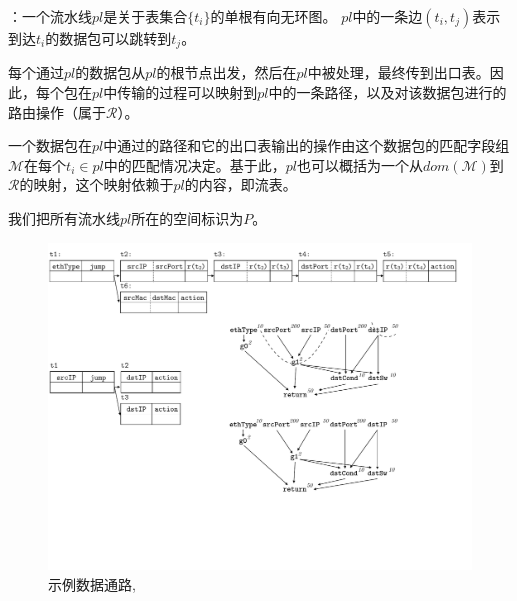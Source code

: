 ：一个流水线$pl$是关于表集合$\{t_i\}$的单根有向无环图。 $pl$中的一条边$(t_i, t_j)$表示到达$t_i$的数据包可以跳转到$t_j$。


每个通过$pl$的数据包从$pl$的根节点出发，然后在$pl$中被处理，最终传到出口表。因此，每个包在$pl$中传输的过程可以映射到$pl$中的一条路径，以及对该数据包进行的路由操作（属于$\mathcal{R}$）。

一个数据包在$pl$中通过的路径和它的出口表输出的操作由这个数据包的匹配字段组$\mathcal{M}$在每个$t_i \in pl$中的匹配情况决定。基于此，$pl$也可以概括为一个从$dom(\mathcal{M})$到$\mathcal{R}$的映射，这个映射依赖于$pl$的内容，即流表。

我们把所有流水线$pl$所在的空间标识为$P$。





\begin{figure}[tbh]
    \centering
    \includegraphics[width=0.9\linewidth]{figures/figure3.pdf}
    \caption{示例数据通路, \exampledp}
    \label{cap:fig:swPipeline}
\end{figure}

